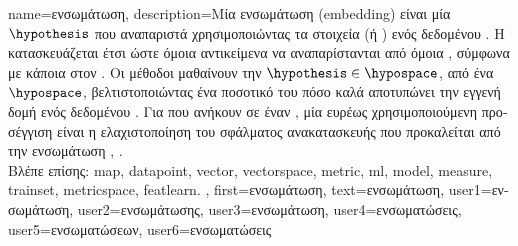 {name={\foreignlanguage{greek}{ενσωμάτωση}},
	description={\foreignlanguage{greek}{Μία ενσωμάτωση} (embedding) \foreignlanguage{greek}{είναι 
		μία}  $\hypothesis$ \foreignlanguage{greek}{που αναπαριστά}  
		\foreignlanguage{greek}{χρησιμοποιώντας τα στοιχεία (ή} ) \foreignlanguage{greek}{ενός δεδομένου} 
		. \foreignlanguage{greek}{Η}  \foreignlanguage{greek}{κατασκευάζεται έτσι ώστε όμοια 
		αντικείμενα να αναπαρίστανται από όμοια} , \foreignlanguage{greek}{σύμφωνα με κάποια}  
		\foreignlanguage{greek}{στον} . \foreignlanguage{greek}{Οι μέθοδοι}  
		\foreignlanguage{greek}{μαθαίνουν την}  $\hypothesis \in \hypospace$, \foreignlanguage{greek}{από ένα}  
		$\hypospace$, \foreignlanguage{greek}{βελτιστοποιώντας ένα ποσοτικό}  \foreignlanguage{greek}{του πόσο καλά 
		αποτυπώνει την εγγενή δομή ενός δεδομένου} . \foreignlanguage{greek}{Για}  
		\foreignlanguage{greek}{που ανήκουν σε έναν} , \foreignlanguage{greek}{μία ευρέως χρησιμοποιούμενη 
		προσέγγιση είναι η ελαχιστοποίηση του σφάλματος ανακατασκευής που προκαλείται από την ενσωμάτωση} 
		\cite{Goodfellow-et-al-2016}, \cite[\foreignlanguage{greek}{Κεφ.} 13]{BishopDeepLearning}.		
		\\
		\foreignlanguage{greek}{Βλέπε επίσης:} \gls{map}, \gls{datapoint}, \gls{vector}, \gls{vectorspace}, \gls{metric}, \gls{ml}, \gls{model}, 
		\gls{measure}, \gls{trainset}, \gls{metricspace}, \gls{featlearn}. },
	first={\foreignlanguage{greek}{ενσωμάτωση}},
	text={\foreignlanguage{greek}{ενσωμάτωση}},
	user1={\foreignlanguage{greek}{ενσωμάτωση}}, %
	user2={\foreignlanguage{greek}{ενσωμάτωσης}}, %
	user3={\foreignlanguage{greek}{ενσωμάτωση}}, %
	user4={\foreignlanguage{greek}{ενσωματώσεις}}, %
	user5={\foreignlanguage{greek}{ενσωματώσεων}}, %
	user6={\foreignlanguage{greek}{ενσωματώσεις}} %
}%

